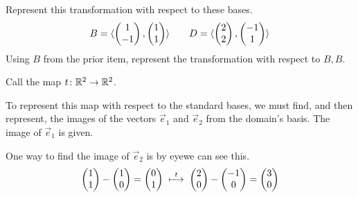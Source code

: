 \begin{exercises}
\begin{exparts}
\begin{equation*}
        \end{equation*}
      \partsitem Represent this transformation with respect to these bases.
        \begin{equation*}
          B=\langle\begin{pmatrix} 1 \\ -1 \end{pmatrix},\begin{pmatrix} 1 \\ 1 \end{pmatrix}\rangle
          \qquad
          D=\langle\begin{pmatrix} 2 \\ 2 \end{pmatrix},\begin{pmatrix} -1 \\ 1 \end{pmatrix}\rangle
        \end{equation*}
      \partsitem Using \( B \) from the prior item, 
        represent the transformation with respect to \( B,B \).
    \end{exparts}
    \begin{answer}
      Call the map \( \mbox{$t\colon \mathbb{R}^2\to \mathbb{R}^2$} \).
      \begin{exparts}
        \partsitem To represent this map with respect to the standard bases, we
          must find, and then represent, the images of the vectors $\vec{e}_1$
          and $\vec{e}_2$ from the domain's basis.
          The image of $\vec{e}_1$ is given.

          One way to find the image of $\vec{e}_2$ is by 
          eye\Dash we can see this.
          \begin{equation*}
            \begin{pmatrix} 1 \\ 1 \end{pmatrix}-\begin{pmatrix} 1 \\ 0 \end{pmatrix}=\begin{pmatrix} 0 \\ 1 \end{pmatrix}
            \;\stackrel{t}{\longmapsto}\;
            \begin{pmatrix} 2 \\ 0 \end{pmatrix}-\begin{pmatrix} -1 \\ 0 \end{pmatrix}=\begin{pmatrix} 3 \\ 0 \end{pmatrix}
          \end{equation*}


\end{exparts}
\end{answer}
\end{exercises}
